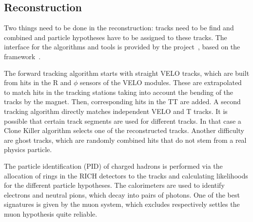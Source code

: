 
\subsection{Reconstruction}
\label{sec:detector:software:reconstruction}

Two things need to be done in the reconstruction: tracks need to be find and
combined and particle hypotheses have to be assigned to these tracks. The
interface for the algorithms and tools is provided by the \brunel
project~\cite{Brunel}, based on the \gaudi framework~\cite{Barrand:2001ny}.

The forward tracking algorithm starts with straight VELO tracks, which are
built from hits in the R and $\phi$ sensors of the VELO modules. These are
extrapolated to match hits in the tracking stations taking into account the
bending of the tracks by the magnet. Then, corresponding hits in the TT are
added. A second tracking algorithm directly matches independent VELO and T
tracks. It is possible that certain track segments are used for different
tracks. In that case a Clone Killer algorithm selects one of the reconstructed
tracks. Another difficulty are ghost tracks, which are randomly combined hits
that do not stem from a real physics particle.

The particle identification (PID) of charged hadrons is performed via the allocation
of rings in the RICH detectors to the tracks and calculating likelihoods for
the different particle hypotheses. The calorimeters are used to identify
electrons and neutral pions, which decay into pairs of photons. One of the
best signatures is given by the muon system, which excludes respectively
settles the muon hypothesis quite reliable.